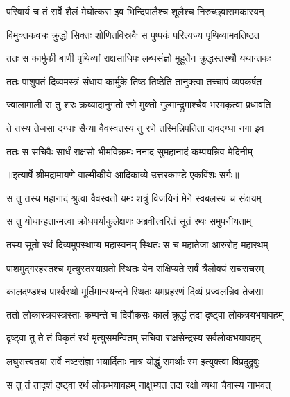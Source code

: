 \twolineshloka
{परिवार्य च तं सर्वे शैलं मेघोत्करा इव}
{भिन्दिपालैश्च शूलैश्च निरुच्छ्वासमकारयन्} %

\twolineshloka
{विमुक्तकवचः क्रुद्धो सिक्तः शोणितविस्रवैः}
{स पुष्पकं परित्यज्य पृथिव्यामवतिष्ठत} %

\twolineshloka
{ततः स कार्मुकी बाणी पृथिव्यां राक्षसाधिपः}
{लब्धसंज्ञो मुहूर्तेन क्रुद्धस्तस्थौ यथान्तकः} %

\twolineshloka
{ततः पाशुपतं दिव्यमस्त्रं संधाय कार्मुके}
{तिष्ठ तिष्ठेति तानुक्त्वा तच्चापं व्यपकर्षत} %

\twolineshloka
{ज्वालामाली स तु शरः क्रव्यादानुगतो रणे}
{मुक्तो गुल्मान्द्रुमांश्चैव भस्मकृत्वा प्रधावति} %

\twolineshloka
{ते तस्य तेजसा दग्धाः सैन्या वैवस्वतस्य तु}
{रणे तस्मिन्निपतिता दावदग्धा नगा इव} %

\twolineshloka
{ततः स सचिवैः सार्धं राक्षसो भीमविक्रमः}
{ननाद सुमहानादं कम्पयन्निव मेदिनीम्} %


{॥इत्यार्षे श्रीमद्रामायणे वाल्मीकीये आदिकाव्ये उत्तरकाण्डे एकविंशः सर्गः॥}


\twolineshloka
{स तु तस्य महानादं श्रुत्वा वैवस्वतो यमः}
{शत्रुं विजयिनं मेने स्वबलस्य च संक्षयम्} %

\twolineshloka
{स तु योधान्हतान्मत्वा क्रोधपर्याकुलेक्षणः}
{अब्रवीत्त्वरितं सूतं रथः समुपनीयताम्} %

\twolineshloka
{तस्य सूतो रथं दिव्यमुपस्थाप्य महास्वनम्}
{स्थितः स च महातेजा आरुरोह महारथम्} %

\twolineshloka
{पाशमुद्गरहस्तश्च मृत्युस्तस्याग्रतो स्थितः}
{येन संक्षिप्यते सर्वं त्रैलोक्यं सचराचरम्} %

\twolineshloka
{कालदण्डश्च पार्श्वस्थो मूर्तिमान्स्यन्दने स्थितः}
{यमप्रहरणं दिव्यं प्रज्वलन्निव तेजसा} %

\twolineshloka
{ततो लोकास्त्रयस्त्रस्ताः कम्पन्ते च दिवौकसः}
{कालं क्रुद्धं तदा दृष्ट्वा लोकत्रयभयावहम्} %

\twolineshloka
{दृष्ट्वा तु ते तं विकृतं रथं मृत्युसमन्वितम्}
{सचिवा राक्षसेन्द्रस्य सर्वलोकभयावहम्} %

\twolineshloka
{लघुसत्त्वतया सर्वे नष्टसंज्ञा भयार्दिताः}
{नात्र योद्धुं समर्थाः स्म इत्युक्त्वा विप्रदुद्रुवुः} %

\twolineshloka
{स तु तं तादृशं दृष्ट्वा रथं लोकभयावहम्}
{नाक्षुभ्यत तदा रक्षो व्यथा चैवास्य नाभवत्} %

